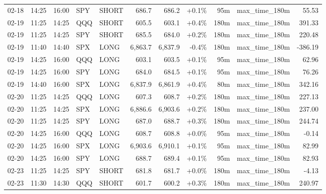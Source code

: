 \documentclass[11pt,a4paper,twoside]{article}
\begin{document}
\begin{center}
\begin{longtable}{>{\color{txtmain}}l l l l l r r r r >{\color{txtmain}}l r}
02-18 & 14:25 & 16:00 & SPY & SHORT & 686.7 & 686.2 & \textcolor{wingreen}{+0.1\%} & 95m & max\_time\_180m & \textcolor{wingreen}{55.53} \\
02-19 & 11:25 & 14:25 & QQQ & SHORT & 605.5 & 603.1 & \textcolor{wingreen}{+0.4\%} & 180m & max\_time\_180m & \textcolor{wingreen}{391.33} \\
02-19 & 11:25 & 14:25 & SPY & SHORT & 685.5 & 684.0 & \textcolor{wingreen}{+0.2\%} & 180m & max\_time\_180m & \textcolor{wingreen}{220.48} \\
02-19 & 11:40 & 14:40 & SPX & LONG & 6,863.7 & 6,837.9 & \textcolor{lossred}{-0.4\%} & 180m & max\_time\_180m & \textcolor{lossred}{-386.19} \\
02-19 & 14:25 & 16:00 & QQQ & LONG & 603.1 & 603.5 & \textcolor{wingreen}{+0.1\%} & 95m & max\_time\_180m & \textcolor{wingreen}{62.96} \\
02-19 & 14:25 & 16:00 & SPY & LONG & 684.0 & 684.5 & \textcolor{wingreen}{+0.1\%} & 95m & max\_time\_180m & \textcolor{wingreen}{76.26} \\
02-19 & 14:40 & 16:00 & SPX & LONG & 6,837.9 & 6,861.9 & \textcolor{wingreen}{+0.4\%} & 80m & max\_time\_180m & \textcolor{wingreen}{342.16} \\
02-20 & 11:25 & 14:25 & QQQ & LONG & 607.3 & 608.7 & \textcolor{wingreen}{+0.2\%} & 180m & max\_time\_180m & \textcolor{wingreen}{227.13} \\
02-20 & 11:25 & 14:25 & SPX & LONG & 6,886.6 & 6,903.6 & \textcolor{wingreen}{+0.2\%} & 180m & max\_time\_180m & \textcolor{wingreen}{237.00} \\
02-20 & 11:25 & 14:25 & SPY & LONG & 687.0 & 688.7 & \textcolor{wingreen}{+0.3\%} & 180m & max\_time\_180m & \textcolor{wingreen}{244.74} \\
02-20 & 14:25 & 16:00 & QQQ & LONG & 608.7 & 608.8 & \textcolor{wingreen}{+0.0\%} & 95m & max\_time\_180m & \textcolor{lossred}{-0.14} \\
02-20 & 14:25 & 16:00 & SPX & LONG & 6,903.6 & 6,910.1 & \textcolor{wingreen}{+0.1\%} & 95m & max\_time\_180m & \textcolor{wingreen}{82.99} \\
02-20 & 14:25 & 16:00 & SPY & LONG & 688.7 & 689.4 & \textcolor{wingreen}{+0.1\%} & 95m & max\_time\_180m & \textcolor{wingreen}{82.93} \\
02-23 & 11:25 & 14:25 & SPY & SHORT & 681.8 & 681.7 & \textcolor{wingreen}{+0.0\%} & 180m & max\_time\_180m & \textcolor{lossred}{-4.13} \\
02-23 & 11:30 & 14:30 & QQQ & SHORT & 601.7 & 600.2 & \textcolor{wingreen}{+0.3\%} & 180m & max\_time\_180m & \textcolor{wingreen}{240.97} \\

\end{longtable}
\end{center}
\end{document}
